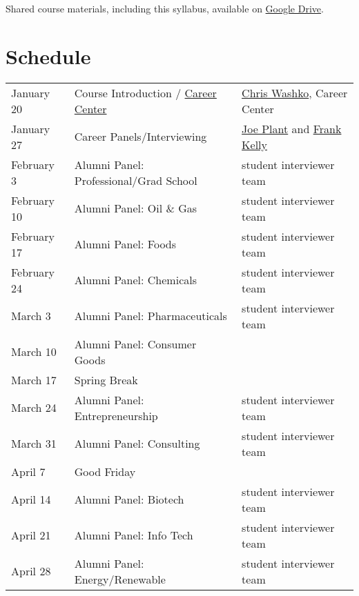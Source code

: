 \documentclass[11pt]{article}
\begin{document}
\noindent Shared course materials, including this syllabus, available on \href{https://drive.google.com/drive/folders/1r\_wSSi8Jvphhkkfh8ujKThlI-RCvBMRM?usp=share\_link}{Google Drive}.

\section{Schedule}
\label{sec:org541443e}
\begin{center}
\begin{tabular}{lll}
January 20 & Course Introduction / \href{./Resources/2022-CareerCenter-1.pdf}{Career Center} & \href{http://linkedin.com/in/chriswashko}{Chris Washko}, Career Center\\
January 27 & Career Panels/Interviewing & \href{https://www.linkedin.com/in/joe-plant-1ba4691/}{Joe Plant} and  \href{https://www.linkedin.com/in/frank-kelly-7a7109b/}{Frank Kelly}\\
February 3 & Alumni Panel: Professional/Grad School & student interviewer team\\
February 10 & Alumni Panel: Oil \& Gas & student interviewer team\\
February 17 & Alumni Panel: Foods & student interviewer team\\
February 24 & Alumni Panel: Chemicals & student interviewer team\\
March 3 & Alumni Panel: Pharmaceuticals & student interviewer team\\
March 10 & Alumni Panel: Consumer Goods & \\
March 17 & Spring Break & \\
March 24 & Alumni Panel: Entrepreneurship & student interviewer team\\
March 31 & Alumni Panel: Consulting & student interviewer team\\
April 7 & Good Friday & \\
April 14 & Alumni Panel: Biotech & student interviewer team\\
April 21 & Alumni Panel: Info Tech & student interviewer team\\
April 28 & Alumni Panel: Energy/Renewable & student interviewer team\\
\end{tabular}
\end{center}
\end{document}
